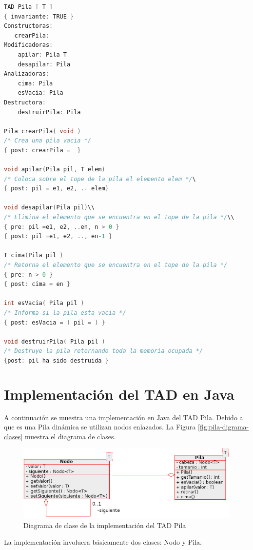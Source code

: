 \begin{lstlisting}[numbers=none, language=C]
TAD Pila [ T ]
{ invariante: TRUE }
Constructoras:
   crearPila: 
Modificadoras:
	apilar: Pila T 
	desapilar: Pila
Analizadoras:
	cima: Pila 
	esVacia: Pila
Destructora:
	destruirPila: Pila

Pila crearPila( void )
/* Crea una pila vacia */
{ post: crearPila =  }

void apilar(Pila pil, T elem)
/* Coloca sobre el tope de la pila el elemento elem */\
{ post: pil = e1, e2, .. elem}

void desapilar(Pila pil)\\
/* Elimina el elemento que se encuentra en el tope de la pila */\\
{ pre: pil =e1, e2, ..en, n > 0 }
{ post: pil =e1, e2, .., en-1 }

T cima(Pila pil )
/* Retorna el elemento que se encuentra en el tope de la pila */
{ pre: n > 0 }
{ post: cima = en }

int esVacia( Pila pil )
/* Informa si la pila esta vacia */
{ post: esVacia = ( pil = ) }

void destruirPila( Pila pil )
/* Destruye la pila retornando toda la memoria ocupada */
{post: pil ha sido destruida }
\end{lstlisting}

\section{Implementación del TAD en Java}
A continuación se muestra una implementación en Java del TAD Pila. Debido a que es una Pila dinámica se utilizan nodos enlazados.  La Figura \ref{fig:pila-digrama-clases} muestra el diagrama de clases.


\begin{figure}
	\centering
		\includegraphics{images/DiagramaClases-Pila}
	\caption{Diagrama de clase de la implementación del TAD Pila}	
	\label{fig:pila-diagrama-clases}
\end{figure}

La implementación involucra básicamente dos clases: Nodo y Pila. 

